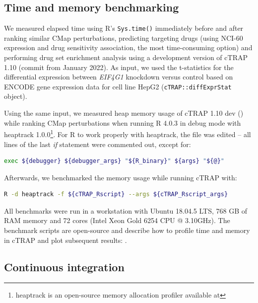 \subsection{Time and memory benchmarking}

We measured elapsed time using R’s \texttt{Sys.time()} immediately before and after ranking similar CMap perturbations, predicting targeting drugs (using NCI-60 expression and drug sensitivity association, the most time-consuming option) and performing drug set enrichment analysis using a development version of cTRAP 1.10 (commit  from January 2022). As input, we used the t-statistics for the differential expression between \emph{EIF4G1} knockdown versus control based on ENCODE gene expression data for cell line HepG2 (\texttt{cTRAP::diffExprStat} object).

Using the same input, we measured heap memory usage of cTRAP 1.10 dev () while ranking CMap perturbations when running R 4.0.3 in debug mode with heaptrack 1.0.0\footnote{heaptrack is an open-source memory allocation profiler available at }. For R to work properly with heaptrack, the  file was edited -- all lines of the last \emph{if} statement were commented out, except for:

\begin{lstlisting}[language=bash,numbers=none]
exec ${debugger} ${debugger_args} "${R_binary}" ${args} "${@}"
\end{lstlisting}

Afterwards, we benchmarked the memory usage while running cTRAP with:

\begin{lstlisting}[language=bash,numbers=none]
R -d heaptrack -f ${cTRAP_Rscript} --args ${cTRAP_Rscript_args}
\end{lstlisting}

All benchmarks were run in a workstation with Ubuntu 18.04.5 LTS, 768 GB of RAM memory and 72 cores (Intel Xeon Gold 6254 CPU @ 3.10GHz). The benchmark scripts are open-source and describe how to profile time and memory in cTRAP and plot subsequent results: .

\subsection{Continuous integration}

